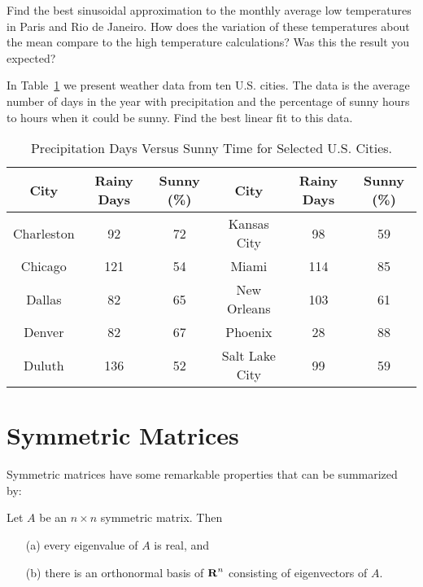 \begin{exercise} \label{c7.6.2}
Find the best sinusoidal approximation to the monthly average low temperatures
in Paris and Rio de Janeiro.  How does the variation of these temperatures
about the mean compare to the high temperature calculations?  Was this the
result you expected?
\end{exercise}


\begin{exercise} \label{c7.6.3}
In Table~\ref{T:sunny} we present weather data from ten U.S. cities.  The
data is the average number of days in the year with precipitation and the
percentage of sunny hours to hours when it could be sunny.  Find the best
linear fit to this data.
\begin{table}[htb]
\begin{center}
\begin{tabular}{|c||c|c||c||c|c|}
\hline
City & Rainy Days & Sunny (\%) & City & Rainy Days & Sunny (\%)\\
\hline
Charleston 	&   92 & 72 & Kansas City 	&   98 & 59\\
Chicago 	&  121 & 54 & Miami 		&  114 & 85 \\
Dallas 		&   82 & 65 & New Orleans 	&  103 & 61 \\
Denver 		&   82 & 67 & Phoenix 		&   28 & 88 \\
Duluth 		&  136 & 52 & Salt Lake City 	&   99 & 59 \\
\hline
\end{tabular}
\caption{Precipitation Days Versus Sunny Time for Selected U.S. Cities.}
\label{T:sunny}
\end{center}
\end{table}
\end{exercise}


\section{Symmetric Matrices}
\label{S:symmetric}

Symmetric matrices have some remarkable properties that can be
summarized by:
\begin{thm}  \label{T:symmetricmat}
Let $A$ be an $n\times n$ symmetric matrix.
Then
\begin{enumerate}
\item[(a)] every eigenvalue
of $A$ is real, and
\item[(b)] there is an orthonormal basis
of $\mbox{$\bf{R}$}^n$ consisting of
	eigenvectors of $A$.
\end{enumerate}
\end{thm}

